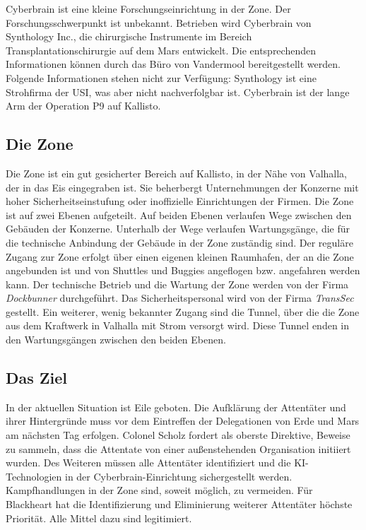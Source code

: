 
Cyberbrain ist eine kleine Forschungseinrichtung in der Zone. Der Forschungsschwerpunkt ist unbekannt. Betrieben wird Cyberbrain von Synthology Inc., die chirurgische Instrumente im Bereich Transplantationschirurgie auf dem Mars entwickelt. Die entsprechenden Informationen können durch das Büro von Vandermool bereitgestellt werden. Folgende Informationen stehen nicht zur Verfügung: Synthology ist eine Strohfirma der USI, was aber nicht nachverfolgbar ist. Cyberbrain ist der lange Arm der Operation P9 auf Kallisto.

\subsection{Die Zone}
Die Zone ist ein gut gesicherter Bereich auf Kallisto, in der Nähe von Valhalla, der in das Eis eingegraben ist. Sie beherbergt Unternehmungen der Konzerne mit hoher Sicherheitseinstufung oder inoffizielle Einrichtungen der Firmen. Die Zone ist auf zwei Ebenen aufgeteilt. Auf beiden Ebenen verlaufen Wege zwischen den Gebäuden der Konzerne. Unterhalb der Wege verlaufen Wartungsgänge, die für die technische Anbindung der Gebäude in der Zone zuständig sind. Der reguläre Zugang zur Zone erfolgt über einen eigenen kleinen Raumhafen, der an die Zone angebunden ist und von Shuttles und Buggies angeflogen bzw. angefahren werden kann. Der technische Betrieb und die Wartung der Zone werden von der Firma \emph{Dockbunner} durchgeführt. Das Sicherheitspersonal wird von der Firma \emph{TransSec} gestellt. Ein weiterer, wenig bekannter Zugang sind die Tunnel, über die die Zone aus dem Kraftwerk in Valhalla mit Strom versorgt wird. Diese Tunnel enden in den Wartungsgängen zwischen den beiden Ebenen.

\subsection{Das Ziel} 
In der aktuellen Situation ist Eile geboten. Die Aufklärung der Attentäter und ihrer Hintergründe muss vor dem Eintreffen der Delegationen von Erde und Mars am nächsten Tag erfolgen. Colonel Scholz fordert als oberste Direktive, Beweise zu sammeln, dass die Attentate von einer außenstehenden Organisation initiiert wurden. Des Weiteren müssen alle Attentäter identifiziert und die KI-Technologien in der Cyberbrain-Einrichtung sichergestellt werden. Kampfhandlungen in der Zone sind, soweit möglich, zu vermeiden. Für Blackheart hat die Identifizierung und Eliminierung weiterer Attentäter höchste Priorität. Alle Mittel dazu sind legitimiert.

